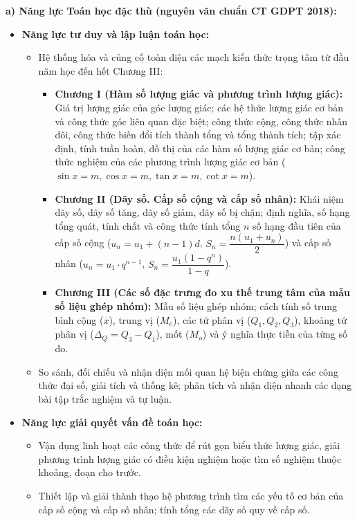 \documentclass[12pt, a4paper]{article}
\begin{document}
\textbf{a) Năng lực Toán học đặc thù (nguyên văn chuẩn CT GDPT 2018):}
\begin{itemize}[leftmargin=1.5em]
    \item \textbf{Năng lực tư duy và lập luận toán học:}
    \begin{itemize}
        \item Hệ thống hóa và củng cố toàn diện các mạch kiến thức trọng tâm từ đầu năm học đến hết Chương III:
        \begin{itemize}
            \item \textbf{Chương I (Hàm số lượng giác và phương trình lượng giác):} Giá trị lượng giác của góc lượng giác; các hệ thức lượng giác cơ bản và công thức góc liên quan đặc biệt; công thức cộng, công thức nhân đôi, công thức biến đổi tích thành tổng và tổng thành tích; tập xác định, tính tuần hoàn, đồ thị của các hàm số lượng giác cơ bản; công thức nghiệm của các phương trình lượng giác cơ bản ($\sin x = m, \cos x = m, \tan x = m, \cot x = m$).
            \item \textbf{Chương II (Dãy số. Cấp số cộng và cấp số nhân):} Khái niệm dãy số, dãy số tăng, dãy số giảm, dãy số bị chặn; định nghĩa, số hạng tổng quát, tính chất và công thức tính tổng $n$ số hạng đầu tiên của cấp số cộng ($u_n = u_1 + (n - 1)d$, $S_n = \dfrac{n(u_1 + u_n)}{2}$) và cấp số nhân ($u_n = u_1 \cdot q^{n-1}$, $S_n = \dfrac{u_1(1 - q^n)}{1 - q}$).
            \item \textbf{Chương III (Các số đặc trưng đo xu thế trung tâm của mẫu số liệu ghép nhóm):} Mẫu số liệu ghép nhóm; cách tính số trung bình cộng ($\overline{x}$), trung vị ($M_e$), các tứ phân vị ($Q_1, Q_2, Q_3$), khoảng tứ phân vị ($\Delta_Q = Q_3 - Q_1$), mốt ($M_o$) và ý nghĩa thực tiễn của từng số đo.
        \end{itemize}
        \item So sánh, đối chiếu và nhận diện mối quan hệ biện chứng giữa các công thức đại số, giải tích và thống kê; phân tích và nhận diện nhanh các dạng bài tập trắc nghiệm và tự luận.
    \end{itemize}
    \item \textbf{Năng lực giải quyết vấn đề toán học:}
    \begin{itemize}
        \item Vận dụng linh hoạt các công thức để rút gọn biểu thức lượng giác, giải phương trình lượng giác có điều kiện nghiệm hoặc tìm số nghiệm thuộc khoảng, đoạn cho trước.
        \item Thiết lập và giải thành thạo hệ phương trình tìm các yếu tố cơ bản của cấp số cộng và cấp số nhân; tính tổng các dãy số quy về cấp số.

\end{itemize}
\end{itemize}
\end{document}
